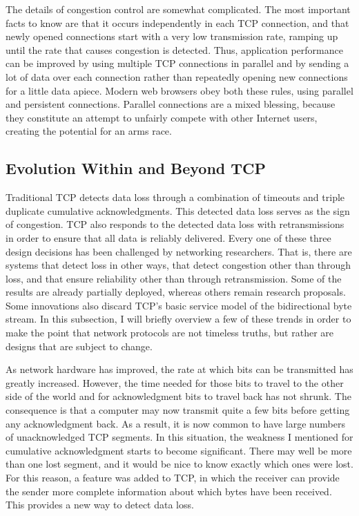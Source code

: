 The details of congestion control are somewhat complicated.  The most
important facts to know are that it occurs independently in each TCP
connection, and that newly opened connections start with a very low
transmission rate, ramping up until the rate that causes congestion is
detected.  Thus, application performance can be improved by using
multiple TCP connections in parallel and by sending a lot of data over
each connection rather than repeatedly opening new connections for
a little data apiece.  Modern web browsers obey both these rules,
using parallel and persistent connections.  Parallel connections are
a mixed blessing, because they constitute an attempt to unfairly
compete with other Internet users, creating the potential for an
arms race.

\subsection{Evolution Within and Beyond TCP}\label{post-tcp-section}

Traditional TCP detects data loss through a combination of timeouts
and triple duplicate cumulative acknowledgments.  This detected data
loss serves as the sign of congestion.  TCP also responds to the
detected data loss with retransmissions in order to ensure that all
data is reliably delivered.  Every one of these three design
decisions has been challenged by networking researchers.  That is,
there are systems that detect loss in other ways, that detect
congestion other than through loss, and that ensure reliability other
than through retransmission.  Some of the results are already
partially deployed, whereas others remain research proposals.  Some
innovations also discard TCP's basic service model of the
bidirectional byte stream.  In this subsection, I will briefly
overview a few of these trends in order to make the point that
network protocols are not timeless truths, but rather are designs
that are subject to change.

As network hardware has improved, the rate at which bits can be
transmitted has greatly increased.  However, the time needed for those
bits to travel to the other side of the world and for acknowledgment
bits to travel back has not shrunk.  The consequence is that a
computer may now transmit quite a few bits before getting any
acknowledgment back.  As a result, it is now common to have large
numbers of unacknowledged TCP segments.  In this situation, the
weakness I mentioned for cumulative acknowledgment starts to become
significant.  There may well be more than one lost segment, and it
would be nice to know exactly which ones were lost.  For this reason,
a  feature was added to TCP, in
which the receiver can provide the sender more complete information
about which bytes have been received.  This provides a new way to
detect data loss.

